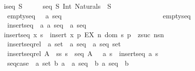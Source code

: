 \begin{isabellebody}
\ {\isachardoublequoteopen}iseq\ S\ \ \ \ \ {\isacharequal}{\isacharequal}\ {\isacharparenleft}seq\ S{\isacharparenright}\ Int\ {\isacharparenleft}Naturals\ {\isachargreater}{\isacharminus}{\isacharbar}{\isacharbar}{\isacharminus}{\isachargreater}\ S{\isacharparenright}{\isachardoublequoteclose}\isanewline
\isanewline
\ \ emptyseq\ \ \ {\isacharcolon}{\isacharcolon}{\isachardoublequoteopen}{\isacharprime}a\ seq{\isachardoublequoteclose}\ \ \ \ \ \ \ \ \ \ \ \ \ \ \ \ \ \ \ \ \ \ \ \ \ \ \ \ {\isacharparenleft}{\isachardoublequoteopen}{\isacharpercent}{\isacharless}{\isacharpercent}{\isachargreater}{\isachardoublequoteclose}{\isacharparenright}\isanewline
\ {\isachardoublequoteopen}emptyseq\ \ \ {\isacharequal}{\isacharequal}\ {\isacharbraceleft}{\isacharbraceright}{\isachardoublequoteclose}\isanewline
\ \ insertseq\ \ {\isacharcolon}{\isacharcolon}{\isachardoublequoteopen}{\isacharbrackleft}{\isacharprime}a{\isacharcomma}\ {\isacharprime}a\ seq{\isacharbrackright}\ {\isacharequal}{\isachargreater}\ {\isacharprime}a\ seq{\isachardoublequoteclose}\isanewline
\ {\isachardoublequoteopen}insertseq\ x\ s\ {\isacharequal}{\isacharequal}\ insert\ {\isacharparenleft}{}{\isacharcomma}x{\isacharparenright}\ {\isacharbraceleft}p{\isachardot}\ EX\ n{\isacharcolon}\ dom\ s{\isachardot}\ p\ {\isacharequal}\ {\isacharparenleft}zsuc\ n{\isacharcomma}s{\isacharpercent}{\isacharcircum}n{\isacharparenright}{\isacharbraceright}{\isachardoublequoteclose}\isanewline
\isanewline
\ \ insertseq{\isacharunderscore}rel\ {\isacharcolon}{\isacharcolon}\ {\isachardoublequoteopen}{\isacharprime}a\ set\ {\isacharequal}{\isachargreater}\ {\isacharparenleft}{\isacharprime}a\ seq\ {\isacharasterisk}\ {\isacharprime}a\ seq{\isacharparenright}\ set{\isachardoublequoteclose}\isanewline
\ \ {\isachardoublequoteopen}insertseq{\isacharunderscore}rel\ A\ {\isacharequal}{\isacharequal}\ {\isacharbraceleft}{\isacharparenleft}s{\isacharcomma}s{\isacharprime}{\isacharparenright}{\isachardot}\ s\ {\isacharcolon}\ seq\ A\ {\isacharampersand}\ {\isacharparenleft}{\isacharquery}\ a{\isachardot}\ s{\isacharprime}\ {\isacharequal}\ insertseq\ a\ s{\isacharparenright}{\isacharbraceright}{\isachardoublequoteclose}\isanewline
\isanewline
\ \ seq{\isacharunderscore}case\ {\isacharcolon}{\isacharcolon}\ {\isachardoublequoteopen}{\isacharbrackleft}{\isacharprime}a\ set{\isacharcomma}\ {\isacharprime}b{\isacharcomma}\ {\isacharparenleft}{\isacharprime}a\ {\isacharequal}{\isachargreater}\ {\isacharprime}a\ seq\ {\isacharequal}{\isachargreater}\ {\isacharprime}b{\isacharparenright}{\isacharcomma}\ {\isacharprime}a\ seq{\isacharbrackright}\ {\isacharequal}{\isachargreater}\ {\isacharprime}b{\isachardoublequoteclose}\isanewline

\end{isabellebody}
